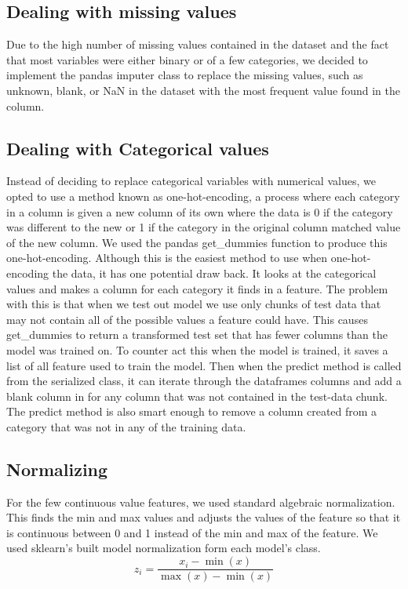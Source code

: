 \documentclass[sigconf]{acmart}
\begin{document}
\subsection{Dealing with missing values}
Due to the high number of missing values contained in the dataset and the fact that most variables were either binary or of a few categories, we decided to implement the pandas imputer class to replace the missing values, such as unknown, blank, or NaN in the dataset with the most frequent value found in the column.
\subsection{Dealing with Categorical values}
Instead of deciding to replace categorical variables with numerical values, we opted to use a method known as one-hot-encoding, a process where each category in a column is given a new column of its own where the data is 0 if the category was different to the new or 1 if the category in the original column matched value of the new column. We used the pandas get\_dummies function to produce this one-hot-encoding. Although this is the easiest method to use when one-hot-encoding the data, it has one potential draw back. It looks at the categorical values and makes a column for each category it finds in a feature. The problem with this is that when we test out model we use only chunks of test data that may not contain all of the possible values a feature could have. This causes get\_dummies to return a transformed test set that has fewer columns than the model was trained on. To counter act this when the model is trained, it saves a list of all feature used to train the model. Then when the predict method is called from the serialized class, it can iterate through the dataframes columns and add a blank column in for any column that was not contained in the test-data chunk. The predict method is also smart enough to remove a column created from a category that was not in any of the training data.
\subsection{Normalizing}
For the few continuous value features, we used standard algebraic normalization. This finds the min and max values and adjusts the values of the feature so that it is continuous between 0 and 1 instead of the min and max of the feature. We used sklearn’s built model normalization form each model’s class.
\begin{equation}
z_{i}=\frac{x_{i}-\min (x)}{\max (x)-\min (x)}
\end{equation}
\end{document}
